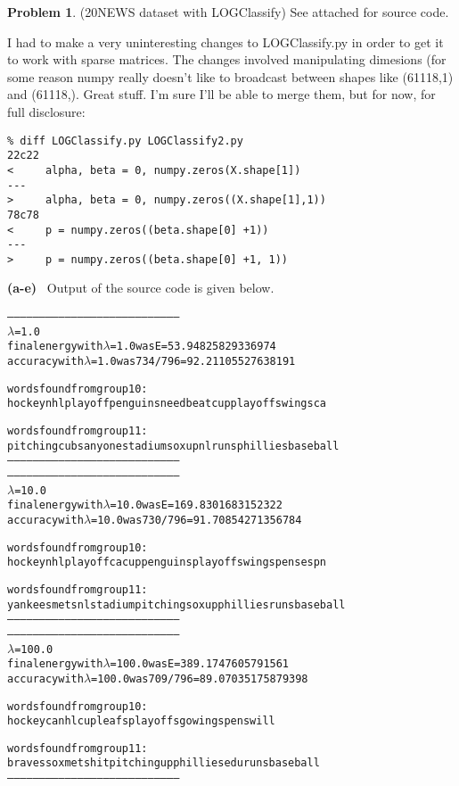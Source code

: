 \documentclass[10pt]{article}
\theoremstyle{plain}
\theoremstyle{definition}
\newtheorem{prob}{Problem}
\numberwithin{equation}{section}
\begin{document}
\begin{prob}
	(20NEWS dataset with LOGClassify) See attached for source code.
\end{prob}

I had to make a very uninteresting changes to LOGClassify.py in order to get it to work with sparse matrices. The changes involved manipulating dimesions (for some reason numpy really doesn't like to broadcast between shapes like (61118,1) and (61118,). Great stuff. I'm sure I'll be able to merge them, but for now, for full disclosure:
\begin{verbatim}
% diff LOGClassify.py LOGClassify2.py
22c22
<     alpha, beta = 0, numpy.zeros(X.shape[1])
---
>     alpha, beta = 0, numpy.zeros((X.shape[1],1))
78c78
<     p = numpy.zeros((beta.shape[0] +1))
---
>     p = numpy.zeros((beta.shape[0] +1, 1))

\end{verbatim}
\textbf{(a-e)} \, Output of the source code is given below.

\begin{alltt}
	% python c3_2.py
--------------------------------------------------------------------------------
\(\lambda\) = 1.0
final energy with \(\lambda\)=1.0 was E=53.94825829336974
accuracy with \(\lambda\)=1.0 was 734/796 = 92.21105527638191

words found from group 10:
hockey nhl playoff penguins need beat cup playoffs wings ca

words found from group 11:
pitching cubs anyone stadium sox up nl runs phillies baseball
--------------------------------------------------------------------------------
--------------------------------------------------------------------------------
\(\lambda\) = 10.0
final energy with \(\lambda\)=10.0 was E=169.8301683152322
accuracy with \(\lambda\)=10.0 was 730/796 = 91.70854271356784

words found from group 10:
hockey nhl playoff ca cup penguins playoffs wings pens espn

words found from group 11:
yankees mets nl stadium pitching sox up phillies runs baseball
--------------------------------------------------------------------------------
--------------------------------------------------------------------------------
\(\lambda\) = 100.0
final energy with \(\lambda\)=100.0 was E=389.1747605791561
accuracy with \(\lambda\)=100.0 was 709/796 = 89.07035175879398

words found from group 10:
hockey ca nhl cup leafs playoffs go wings pens will

words found from group 11:
braves sox mets hit pitching up phillies edu runs baseball
--------------------------------------------------------------------------------
\end{alltt}
\end{document}
